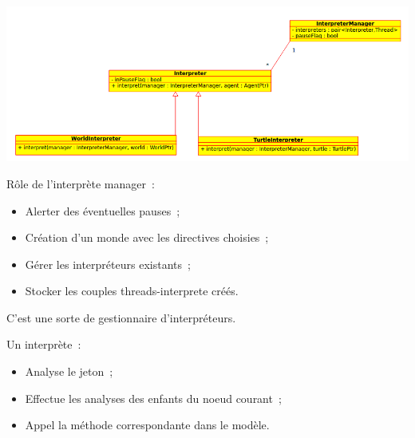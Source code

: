 \begin{frame}
\includegraphics[scale=0.3]{doc/report/uml/interpreterUML.png}
\end{frame}

\begin{frame}
Rôle de l'interprète manager~:
\begin{itemize}
	\item Alerter des éventuelles pauses~;
	\item Création d'un monde avec les directives choisies~;
	\item Gérer les interpréteurs existants~;
	\item Stocker les couples threads-interprete créés.
\end{itemize}
C'est une sorte de gestionnaire d'interpréteurs.
\end{frame}

\begin{frame}
Un interprète~:
\begin{itemize}
	\item Analyse le jeton~;
	\item Effectue les analyses des enfants du noeud courant~;
	\item Appel la méthode correspondante dans le modèle.
\end{itemize}
\end{frame}
